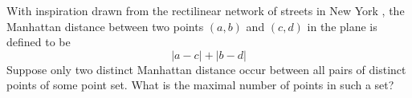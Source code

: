 With inspiration drawn from the rectilinear network of streets in New York , the Manhattan distance between two points $(a,b)$ and $(c,d)$ in the plane is defined to be \[|a-c|+|b-d|\]Suppose only two distinct Manhattan distance occur between all pairs of distinct points of some point set. What is the maximal number of points in such a set?